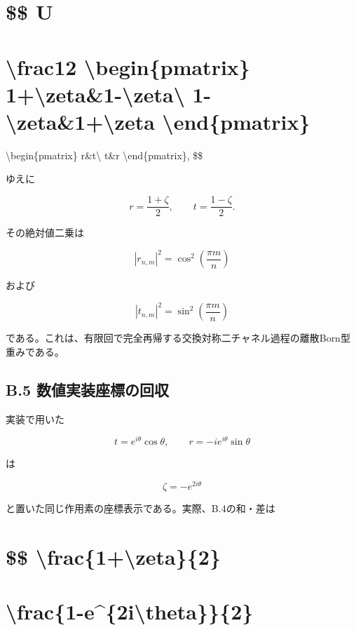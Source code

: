 \documentclass[
  a4paper,
  10pt]{article}
\begin{document}
\section{\$\$ U}\label{-u-1}

\section{\textbackslash frac12 \textbackslash begin\{pmatrix\}
1+\textbackslash zeta\&1-\textbackslash zeta\textbackslash{}
1-\textbackslash zeta\&1+\textbackslash zeta
\textbackslash end\{pmatrix\}}\label{frac12-beginpmatrix-1zeta1-zeta-1-zeta1zeta-endpmatrix-1}

\textbackslash begin\{pmatrix\} r\&t\textbackslash{} t\&r
\textbackslash end\{pmatrix\}, \$\$

ゆえに

\[
r=\frac{1+\zeta}{2},
\qquad
t=\frac{1-\zeta}{2}.
\]

その絶対値二乗は

\[
\boxed{
|r_{n,m}|^2
=\cos^2\left(\frac{\pi m}{n}\right)
}
\]

および

\[
\boxed{
|t_{n,m}|^2
=\sin^2\left(\frac{\pi m}{n}\right)
}
\]

である。これは、有限回で完全再帰する交換対称二チャネル過程の離散Born型重みである。

\subsection{B.5
数値実装座標の回収}\label{b5-ux6570ux5024ux5b9fux88c5ux5ea7ux6a19ux306eux56deux53ce}

実装で用いた

\[
t=e^{i\theta}\cos\theta,
\qquad
r=-ie^{i\theta}\sin\theta
\]

は

\[
\zeta=-e^{2i\theta}
\]

と置いた同じ作用素の座標表示である。実際、B.4の和・差は

\section{\$\$
\textbackslash frac\{1+\textbackslash zeta\}\{2\}}\label{-frac1zeta2}

\section{\textbackslash frac\{1-e\^{}\{2i\textbackslash theta\}\}\{2\}}\label{frac1-e2itheta2}
\end{document}
